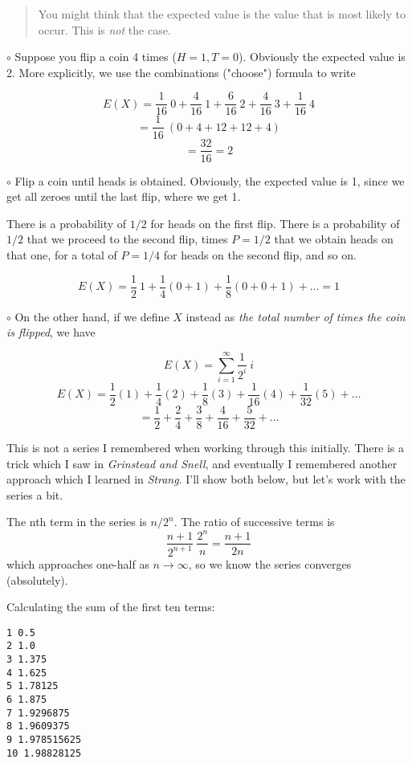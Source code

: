 \documentclass[11pt, oneside]{article}   	%
\begin{document}
\begin{quote}\color{blue}You might think that the expected value is the value that is most likely to occur.  This is \emph{not} the case.\color{black}\end{quote}

$\circ$ Suppose you flip a coin 4 times ($H = 1, T = 0$).  Obviously the expected value is 2.  More explicitly, we use the combinations ("choose") formula to write

\[ E(X) = \frac{1}{16} \ 0 + \frac{4}{16} \ 1 + \frac{6}{16} \ 2 + \frac{4}{16} \ 3 + \frac{1}{16} \ 4 \]
\[ = \frac{1}{16} \ (0 + 4 + 12 + 12 + 4) \]
\[ = \frac{32}{16} = 2 \]

$\circ$ Flip a coin until heads is obtained.  Obviously, the expected value is 1, since we get all zeroes until the last flip, where we get 1. 

There is a probability of $1/2$ for heads on the first flip.  There is a probability of $1/2$ that we proceed to the second flip, times $P=1/2$ that we obtain heads on that one, for a total of $P = 1/4$ for heads on the second flip, and so on.

\[ E(X) = \frac{1}{2} \ 1 + \frac{1}{4} (0 + 1) +  \frac{1}{8}(0 + 0 + 1) + \dots = 1 \]

$\circ$ On the other hand, if we define $X$ instead as \emph{the total number of times the coin is flipped}, we have

\[ E(X) = \sum_{i=1}^{\infty} \frac{1}{2^i} \ i \]
\[ E(X) = \frac{1}{2} (1) + \frac{1}{4} (2) +  \frac{1}{8}(3) +  \frac{1}{16}(4) +  \frac{1}{32}(5) + \dots \]
\[ = \frac{1}{2} + \frac{2}{4} + \frac{3}{8} + \frac{4}{16} + \frac{5}{32} + \dots \]

This is not a series I remembered when working through this initially.  There is a trick which I saw in \emph{Grinstead and Snell}, and eventually I remembered another approach which I learned in \emph{Strang}. I'll show both below, but let's work with the series a bit.

The nth term in the series is $n/2^n$.  The ratio of successive terms is
\[ \frac{n+1}{2^{n+1}} \ \frac{2^n}{n} = \frac{n+1}{2n} \]
which approaches one-half as $n \rightarrow \infty$, so we know the series converges (absolutely).

Calculating the sum of the first ten terms:
\large
\begin{verbatim}
1 0.5
2 1.0
3 1.375
4 1.625
5 1.78125
6 1.875
7 1.9296875
8 1.9609375
9 1.978515625
10 1.98828125
\end{verbatim}
\Large
\end{document}
